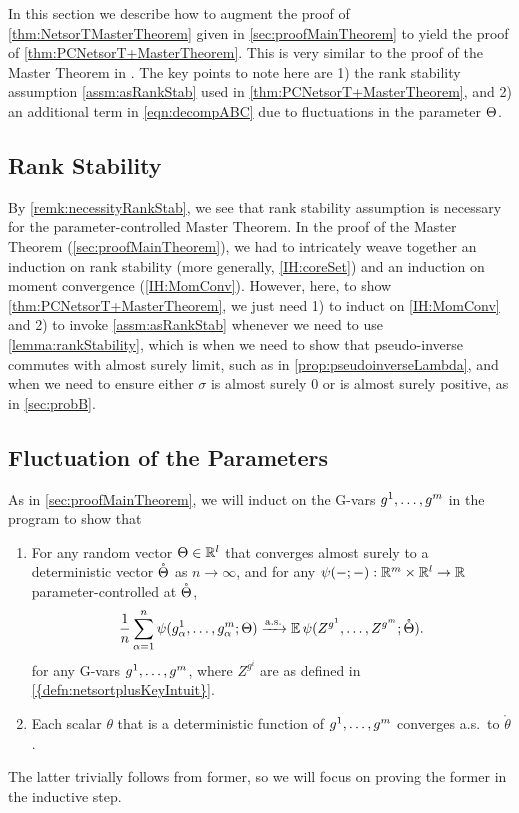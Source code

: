 \documentclass[main.tex]{subfiles}
\begin{document}
\label{sec:netsortplusMasterTheoremProof}

In this section we describe how to augment the proof of \cref{thm:NetsorTMasterTheorem} given in \cref{sec:proofMainTheorem} to yield the proof of \cref{thm:PCNetsorT+MasterTheorem}.
This is very similar to the proof of the \netsorplus{} Master Theorem in \citet{yangTP1}.
The key points to note here are 1) the rank stability assumption \cref{assm:asRankStab} used in \cref{thm:PCNetsorT+MasterTheorem}, and 2) an additional term in \cref{eqn:decompABC} due to fluctuations in the parameter $\Theta$.

\subsection{Rank Stability}

By \cref{remk:necessityRankStab}, we see that rank stability assumption is necessary for the parameter-controlled \netsortplus{} Master Theorem.
In the proof of the \netsort{} Master Theorem (\cref{sec:proofMainTheorem}), we had to intricately weave together an induction on rank stability (more generally, \ref{IH:coreSet}) and an induction on moment convergence (\ref{IH:MomConv}).
However, here, to show \cref{thm:PCNetsorT+MasterTheorem}, we just need 1) to induct on \ref{IH:MomConv} and 2)
to invoke \cref{assm:asRankStab} whenever we need to use \cref{lemma:rankStability}, which is when we need to show that pseudo-inverse commutes with almost surely limit, such as in \cref{prop:pseudoinverseLambda}, and when we need to ensure either $\sigma$ is almost surely 0 or is almost surely positive, as in \cref{sec:probB}.

\subsection{Fluctuation of the Parameters}
\label{sec:D}
As in \cref{sec:proofMainTheorem}, we will induct on the G-vars $g^1, \ldots, g^m$ in the program to show that
\begin{enumerate}
  \item For any random vector $\Theta \in \mathbb{R}^l$ that converges almost surely to a deterministic vector $\mathring{\Theta}$ as $n \to \infty$, and for any $\psi(-; -): \mathbb{R}^m \times \mathbb{R}^l \to \mathbb{R}$ parameter-controlled at $\mathring{\Theta}$,
  \begin{align*}
      \frac{1}{n} \sum_{\alpha=1}^n \psi(g^1_\alpha, \ldots, g^m_\alpha; \Theta) \xrightarrow{\mathrm{a.s.}} \operatorname*{\mathbb{E}}\psi(Z^{g^1}, \ldots, Z^{g^m}; \mathring{\Theta}).
  \end{align*}
  for any G-vars $g^1, \ldots, g^m$, 
  where $Z^{g^{i}}$ are as defined in \cref{{defn:netsortplusKeyIntuit}}.
  \item Each scalar $\theta$ that is a deterministic function of $g^1, \ldots, g^m$ converges a.s.\ to $\mathring \theta$.
\end{enumerate}
The latter trivially follows from former, so we will focus on proving the former in the inductive step.
\end{document}
